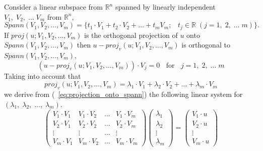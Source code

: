 \documentclass[color=black,11pt]{elegantpaper}
\begin{document}
Consider a linear subspace from $\mathbb{R}^n$ spanned by linearly independent $V_1,\;V_2,\; \dots \; V_m$ from $\mathbb{R}^n,$ 
$$
Spann(V_1,V_2,\dots,V_m)=\{ t_1 \cdot V_1+t_2 \cdot V_2 + \dots + t_m V_m;\;\;\; t_j \in \mathbb{R}\;(j=1,\;2,\; \dots \; m)\}.
$$
If $proj(u;V_1,V_2,\dots,V_m)$ is the orthogonal projection of $u$ onto $Spann(V_1,V_2,\dots,V_m)$ then $u- proj_v(u;V_1,V_2,\dots,V_m)$ is orthogonal to $Spann(V_1,V_2,\dots,V_m),$
\begin{equation}
\label{eq:projection_onto_spann}
(u- proj_v(u;V_1,V_2,\dots,V_m))\cdot V_j = 0\;\;\mbox{ for }\;\;j=1,\;2,\; \dots \; m
\end{equation}
Taking into account that
\begin{equation}
\label{eq:projection_onto_spann_1}
proj_v(u;V_1,V_2,\dots,V_m) = \lambda_1 \cdot V_1 + \lambda_2 \cdot V_2 +\dots + \lambda_m \cdot V_m
\end{equation}
we derive from (~\ref{eq:projection_onto_spann}) the following linear system for $(\lambda_1, \;\lambda_2,\;\dots, \;\lambda_m).$
\begin{equation}
\label{eq:Gramm_system}
\left(\begin{array}{cccc}
             V_1 \cdot V_1 & V_1 \cdot V_2 & \dots & V_1 \cdot V_m\\
             V_2 \cdot V_1 & V_2 \cdot V_2 & \dots & V_2 \cdot V_m\\
             \vdots & \vdots & \dots &\vdots \\
             V_m \cdot V_1 & V_m \cdot V_2 & \dots & V_m \cdot V_m
      \end{array}  \right)\left(\begin{array}{c} 
                                \lambda_1\\
                                \lambda_2\\
                                  \vdots \\
                                \lambda_m
                                \end{array}
                          \right)
                          = \left(\begin{array}{c}
                               V_1 \cdot u\\
                               V_2 \cdot u\\
                                  \vdots \\
                               V_m \cdot u
                                \end{array}
                           \right)
\end{equation}
\end{document}
